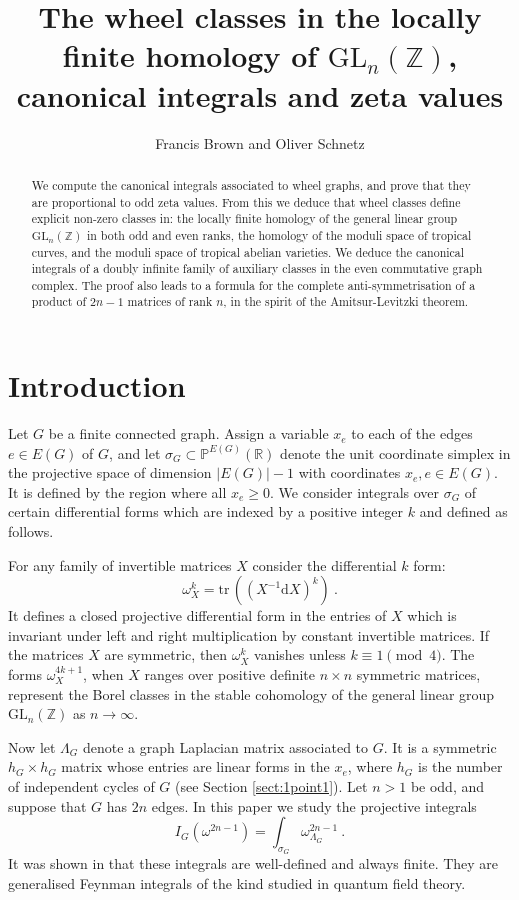 \documentclass[10pt]{amsart}
\title{The wheel classes in the locally finite homology of $\mathrm{GL}_n(\mathbb{Z})$, canonical integrals and zeta values}
\author{Francis Brown and Oliver Schnetz}
\newcommand{\PP}{{\mathbb P}}
\newcommand{\RR}{{\mathbb R}}
\newcommand{\ZZ}{{\mathbb Z}}
\newcommand{\dd}{\mathrm{d}}
\newcommand{\tr}{\mathrm{tr}\,}
\theoremstyle{plain}
\newcommand{\GL}{\mathrm{GL}}
\newcommand{\0}{\color{blue}{\mathsf{0}}}
\begin{document}
\begin{abstract}
We compute the canonical integrals associated to wheel graphs, and prove that they are proportional to odd zeta values. From this we deduce that wheel classes define explicit non-zero classes in: the locally finite homology of the general linear group $\GL_n(\ZZ)$ in both odd and even ranks, the homology of the moduli space of tropical curves,  and the moduli space of tropical abelian varieties. We deduce the canonical integrals of a doubly infinite family of auxiliary classes in the even commutative graph complex. The proof also leads to a formula for the complete anti-symmetrisation of a product of $2n-1$ matrices of rank $n$, in the spirit of the Amitsur-Levitzki theorem.
\end{abstract}

\maketitle

\section{Introduction}
Let $G$ be a finite connected graph.  Assign   a variable $x_e$ to each of the edges $e\in E(G)$ of $G$, and let 
$\sigma_{G}   \subset  \PP^{E(G)}(\RR)$ 
denote  the unit coordinate simplex in the projective space of dimension $|E(G)|-1$ with  coordinates $x_e, e\in E(G)$. It is defined by the  region where all  $x_e\geq 0$. We consider  integrals over $\sigma_G$  of certain differential  forms which are indexed by a positive integer $k$ and defined   as follows. 

For any family of invertible matrices  $X$ consider the differential $k$ form:
 \begin{equation} \label{intro:omegandef}
 \omega_X^{k} = \tr ((X^{-1} \dd X)^k)\ .
 \end{equation}
It defines a closed  projective differential form in the entries of $X$ which is invariant under left and right multiplication by constant invertible matrices. If the matrices  $X$ are symmetric, then $\omega_X^k$ vanishes unless $k\equiv 1 \pmod{4}$. The forms   $\omega^{4k+1}_X$,  when $X$ ranges over positive definite $n\times n$ symmetric matrices, represent the Borel classes in the stable cohomology \cite{Borel} of the general linear group $\mathrm{GL}_n(\ZZ)$ as $n\rightarrow \infty$. 


Now let   $\Lambda_{G}$ denote a graph Laplacian matrix associated to $G$. It is a symmetric $h_G \times h_G$ matrix whose entries are linear forms in the $x_e$, where $h_G$ is the number of independent cycles of $G$ (see Section \ref{sect:1point1}).  Let $n>1$ be odd, and suppose that $G$ has $2n$ edges. In this paper  we  study the projective integrals    
\begin{equation}  \label{intro: IGdef} I_{G} (\omega^{2n-1}) =  \int_{\sigma_{G}}  \omega^{2n-1}_{\Lambda_G} \ . 
\end{equation}
It was shown in  \cite{BrSigma} that these integrals are well-defined and  always finite. They   are generalised Feynman integrals of the kind studied in quantum field theory. 
\end{document}
